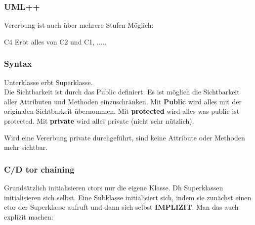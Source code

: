 \subsubsection{UML++}

Vererbung ist auch über mehrere Stufen Möglich:

\begin{center}
\end{center}

C4 Erbt alles von C2 und C1, .....

\subsubsection{Syntax}



Unterklasse erbt Superklasse.\\

Die Sichtbarkeit ist durch das Public definiert. 
Es ist möglich die Sichtbarkeit aller Attributen und Methoden einzuschränken. 
Mit \textbf{Public} wird alles mit der originalen Sichtbarkeit übernommen. 
Mit \textbf{protected} wird alles was public ist protected. 
Mit \textbf{private} wird alles private (nicht sehr nützlich).

Wird eine Vererbung private durchgeführt, sind keine Attribute oder Methoden mehr sichtbar.

\subsubsection{C/D tor chaining}

Grundsätzlich initialisieren ctors nur die eigene Klasse. 
Dh Superklassen initialisieren sich selbst. 
Eine Subklasse initialisiert sich, indem sie zunächst einen ctor der Superklasse aufruft und dann sich selbst \textbf{IMPLIZIT}. 
Man das auch explizit machen:

